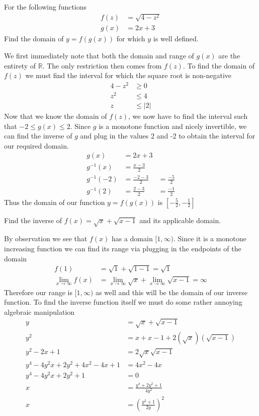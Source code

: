 \documentclass[a4paper]{article}
\begin{document}
\begin{question}
For the following functions
\begin{align*}
f(z) &= \sqrt{4-z^2} \\
g(x) &= 2x +3
\end{align*}
Find the domain of \(y = f(g(x))\) for which \(y\) is well defined.
\end{question}
We first immediately note that both the domain and range of \(g(x)\) are the entirety of \(\mathbb{R}\). The only restriction then comes from \(f(z)\). To find the domain of \(f(z)\) we must find the interval for which the square root is non-negative
\begin{align*}
4-z^2 &\geq 0 \\
z^2  &\leq 4 \\
z &\leq |2|
\end{align*}
Now that we know the domain of \(f(z)\), we now have to find the interval such that \(-2 \leq g(x) \leq 2\). Since \(g\) is a monotone function and nicely invertible, we can find the inverse of \(g\) and plug in the values 2 and -2 to obtain the interval for our required domain.
\begin{align*}
g(x) &= 2x +3 \\
g^{-1}(x) &= \frac{x-3}{2} \\
g^{-1}(-2) &= \frac{-2 -3}{2} &= \frac{-5}{2} \\
g^{-1}(2) &= \frac{2 -3}{2} &= \frac{-1}{2}
\end{align*}
Thus the domain of our function \(y = f(g(x))\) is \(\left[-\frac{5}{2},-\frac{1}{2}\right]\)
\begin{question}
	Find the inverse of \(f(x) = \sqrt{x} + \sqrt{x-1}\) and its applicable domain.
\end{question}
By observation we see that \(f(x)\) has a domain \([1, \infty)\). Since it is a monotone increasing function we can find its range via plugging in the endpoints of the domain
\begin{align*}
f(1) &= \sqrt{1} + \sqrt{1-1} = \sqrt{1} \\
\lim_{x\to \infty} f(x)&= \lim_{x\to \infty} \sqrt{x} + \lim_{x\to \infty} \sqrt{x-1} = \infty
\end{align*}
Therefore our range is \([1, \infty)\) as well and this will be the domain of our inverse function. To find the inverse function itself we must do some rather annoying algebraic manipulation
\begin{align*}
y &= \sqrt{x} + \sqrt{x-1} \\
y^2 &= x + x-1 + 2(\sqrt{x})(\sqrt{x-1}) \\
y^2 -2x +1 &= 2\sqrt{x}\sqrt{x-1} \\
y^4 -4y^2x +2y^2 +4x^2 -4x +1 &= 4x^2-4x \\
y^4 -4y^2x +2y^2 +1 &= 0 \\
x &= \frac{y^4 +2y^2 +1}{4y^2} \\
x &= \left(\frac{y^2+1}{2y}\right)^2
\end{align*}
\end{document}
